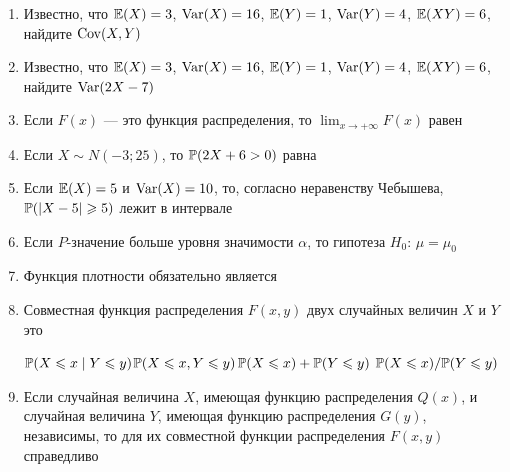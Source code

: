 \documentclass[12pt, a4paper]{article}\usepackage[]{graphicx}\usepackage[]{color}
\begin{document}
\begin{enumerate}
\item Известно, что $\E(X)=3$, $\Var(X)=16$, $\E(Y)=1$, $\Var(Y)=4$, $\E(XY)=6$, найдите $\Cov(X,Y)$



\item Известно, что $\E(X)=3$, $\Var(X)=16$, $\E(Y)=1$, $\Var(Y)=4$, $\E(XY)=6$, найдите $\Var(2X-7)$


\item Если $F(x)$ — это функция распределения, то $\lim_{x\to +\infty}F(x)$ равен


\item Если $X\sim N(-3;25)$, то $\P(2X+6>0)$ равна


\item Если $\E(X)=5$ и $\Var(X)=10$, то, согласно неравенству Чебышева, $\P(|X-5|\geq 5)$ лежит в интервале

\otvet{$[0;1]$}{$[0;0.4]$}{$[0.4;1]$}{$[0;0.6]$}{$[0.6;1]$}

\item Если $P$-значение больше уровня значимости $\alpha$, то гипотеза $H_0$: $\mu=\mu_0$


\item Функция плотности обязательно является


\item Совместная функция распределения $F(x,y)$ двух случайных величин $X$ и $Y$ это

{$\P(X\leq x\mid Y\leq y)$}{$\P(X\leq x,Y\leq y)$}{$\P(X\leq x)+\P(Y\leq y)$}
{$\P(X\leq x)/ \P(Y\leq y)$}

\item Если случайная величина $X$, имеющая функцию распределения $Q(x)$, и случайная величина $Y$, имеющая функцию распределения $G(y)$, независимы, то для их совместной функции распределения  $F(x,y)$ справедливо


\end{enumerate}
\end{document}
